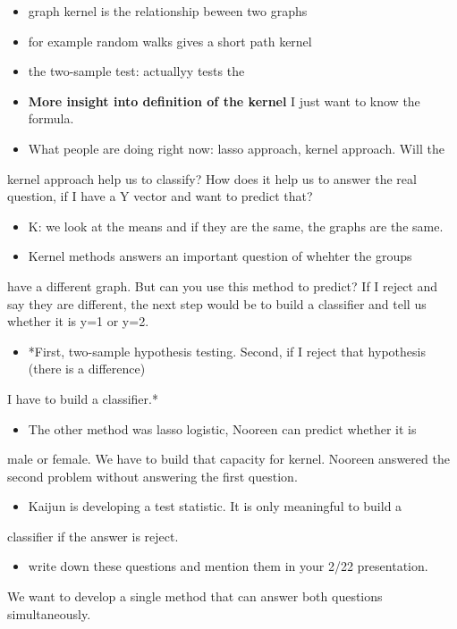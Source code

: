 \documentclass[11pt]{article}
\begin{document}
\begin{itemize}
\item graph kernel is the relationship beween two graphs
\item for example random walks gives a short path kernel
\item the two-sample test: actuallyy tests the

\item \textbf{More insight into definition of the kernel} I just want to know the formula.

\item What people are doing right now: lasso approach, kernel approach. Will the
\end{itemize}
kernel approach help us to classify? How does it help us to answer the
real question, if I have a Y vector and want to predict that?

\begin{itemize}
\item K: we look at the means and if they are the same, the graphs are the same.

\item Kernel methods answers an important question of whehter the groups
\end{itemize}
have a different graph. But can you use this method to predict? If I reject and say 
they are different, the next step would be to build a classifier and tell
us whether it is y=1 or y=2.

\begin{itemize}
\item *First, two-sample hypothesis testing. Second, if I reject that hypothesis (there is a difference)
\end{itemize}
I have to build a classifier.*

\begin{itemize}
\item The other method was lasso logistic, Nooreen can predict whether it is
\end{itemize}
male or female. We have to build that capacity for kernel. Nooreen answered the
second problem without answering the first question.

\begin{itemize}
\item Kaijun is developing a test statistic. It is only meaningful to build a
\end{itemize}
classifier if the answer is reject.

\begin{itemize}
\item write down these questions and mention them in your 2/22 presentation.
\end{itemize}
We want to develop a single method that can answer both questions simultaneously.
\end{document}
